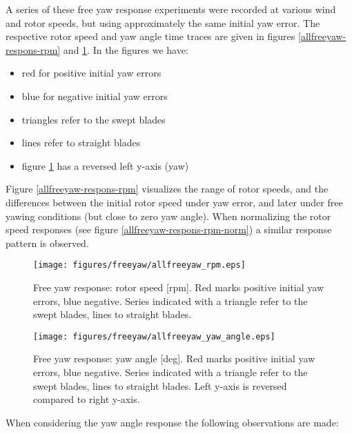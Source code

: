 \documentclass[a4paper]{jpconf}
\begin{document}
A series of these free yaw response experiments were recorded at various wind and rotor speeds, but using approximately the same initial yaw error. The respective rotor speed and yaw angle time traces are given in figures \ref{allfreeyaw-respons-rpm} and \ref{allfreeyaw-respons-yaw}. In the figures we have:
\begin{itemize}
	\item red for positive initial yaw errors
	\item blue for negative initial yaw errors
	\item triangles refer to the swept blades
	\item lines refer to straight blades
	\item figure \ref{allfreeyaw-respons-yaw} has a reversed left y-axis (yaw)
\end{itemize}

Figure \ref{allfreeyaw-respons-rpm} visualizes the range of rotor speeds, and the differences between the initial rotor speed under yaw error, and later under free yawing conditions (but close to zero yaw angle). When normalizing the rotor speed responses (see figure \ref{allfreeyaw-respons-rpm-norm}) a similar response pattern is observed. 

\begin{figure}[h]
\begin{minipage}{\textwidth}
\centering
\texttt{[image: figures/freeyaw/allfreeyaw\_rpm.eps]}
\caption{\label{allfreeyaw-respons-rpm} Free yaw response: rotor speed [rpm]. Red marks positive initial yaw errors, blue negative. Series indicated with a triangle refer to the swept blades, lines to straight blades.}
\end{minipage}
\begin{minipage}{\textwidth}
\centering
\texttt{[image: figures/freeyaw/allfreeyaw\_yaw\_angle.eps]}
\caption{\label{allfreeyaw-respons-yaw} Free yaw response: yaw angle [deg]. Red marks positive initial yaw errors, blue negative. Series indicated with a triangle refer to the swept blades, lines to straight blades. Left y-axis is reversed compared to right y-axis.}
\end{minipage} 
\end{figure}

When considering the yaw angle response the following observations are made:
\end{document}
